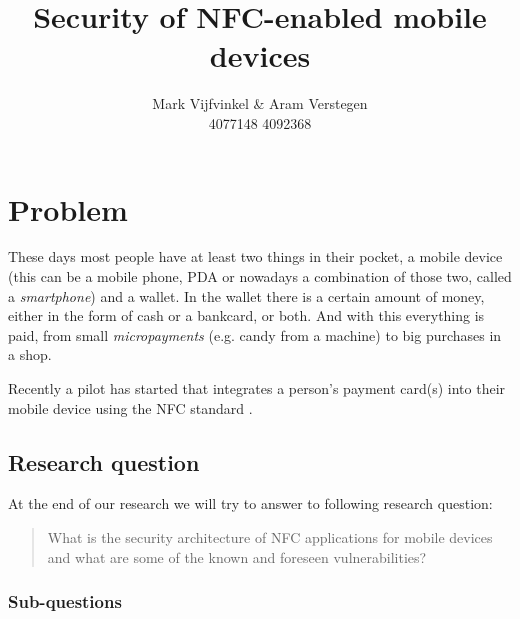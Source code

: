 \documentclass[11pt]{article} %
\title{Security of NFC-enabled mobile devices}
\author{Mark Vijfvinkel \& Aram Verstegen \\ 4077148 4092368}
\date{} %
\begin{document}
\maketitle


\section{Problem}
These days most people have at least two things in their pocket, a mobile device (this can be a mobile phone, PDA or nowadays a combination of those two, called a \textit{smartphone}) and a wallet.
In the wallet there is a certain amount of money, either in the form of cash or a bankcard, or both.
And with this everything is paid, from small \textit{micropayments} (e.g. candy from a machine) to big purchases in a shop.

Recently a pilot has started \cite{payter} that integrates a person's payment card(s) into their mobile device using the NFC standard \cite{nfcstd}.

\newpage
\subsection{Research question}

At the end of our research we will try to answer to following research question: 

\begin{quote}
What is the security architecture of NFC applications for mobile devices and what are some of the known and foreseen vulnerabilities? %
\end{quote}

\subsubsection{Sub-questions}
\end{document}
